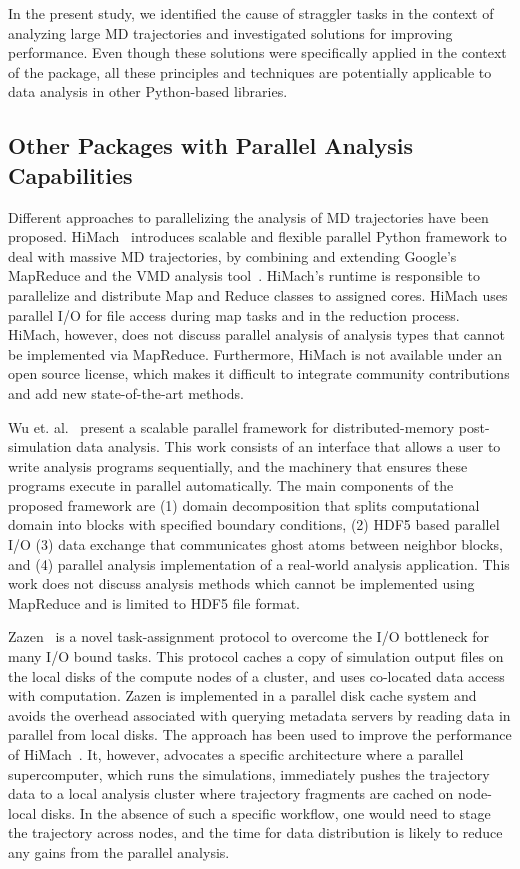 In the present study, we identified the cause of straggler tasks in the context of analyzing large MD trajectories and investigated solutions for improving performance.
Even though these solutions were specifically applied in the context of the  package, all these principles and  techniques are potentially applicable to data analysis in other Python-based libraries.

\subsection{Other Packages with Parallel Analysis Capabilities}
\label{sec:otherparallel}

Different approaches to parallelizing the analysis of MD trajectories have been proposed.
HiMach~\cite{himach-2008} introduces scalable and flexible parallel Python framework to deal with massive MD trajectories, by combining and extending Google's MapReduce and the VMD analysis tool~\cite{Hum96}. 
HiMach's runtime is responsible to parallelize and distribute Map and Reduce classes to assigned cores.
HiMach uses parallel I/O for file access during map tasks and  in the reduction process. 
HiMach, however, does not discuss parallel analysis of analysis types that cannot be implemented via MapReduce.
Furthermore, HiMach is not available under an open source license, which makes it difficult to integrate community contributions and add new state-of-the-art methods.

Wu et. al.~\cite{Wu_et.al} present a scalable parallel framework for distributed-memory post-simulation data analysis.
This work consists of an interface that allows a user to write analysis programs sequentially, and the machinery that ensures these programs execute in parallel automatically. 
The main components of the proposed framework are (1) domain decomposition that splits computational domain into blocks with specified boundary conditions, (2) HDF5 based parallel I/O (3) data exchange that communicates ghost atoms between neighbor blocks, and (4) parallel analysis implementation of a real-world analysis application.
This work does not discuss analysis methods which cannot be implemented using MapReduce and is limited to HDF5 file format.

Zazen~\cite{Zazen} is a novel task-assignment protocol to overcome the I/O bottleneck for many I/O bound tasks. This protocol caches a copy of simulation output files on the local disks of the compute nodes of a cluster, and uses co-located data access with computation. 
Zazen is implemented in a parallel disk cache system and avoids the overhead associated with querying metadata servers by reading data in parallel from local disks.
The approach has been used to improve the performance of HiMach~\cite{himach-2008}.
It, however, advocates a specific architecture where a parallel supercomputer, which runs the simulations, immediately pushes the trajectory data to a local analysis cluster where trajectory fragments are cached on node-local disks.
In the absence of such a specific  workflow, one would need to stage the trajectory across nodes, and the time for data distribution is likely to reduce any gains from the parallel analysis.


